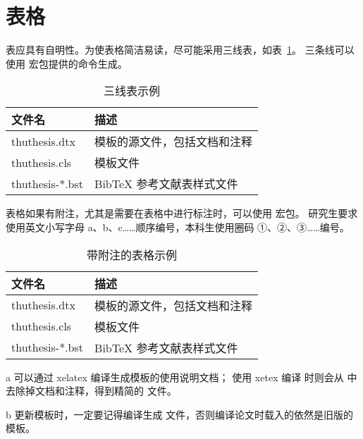 \section{表格}

表应具有自明性。为使表格简洁易读，尽可能采用三线表，如表~\ref{tab:three-line}。
三条线可以使用  宏包提供的命令生成。

\begin{table}
  \centering
  \caption{三线表示例}
  \begin{tabular}{ll}
    \toprule
    文件名          & 描述                         \\
    \midrule
    thuthesis.dtx   & 模板的源文件，包括文档和注释 \\
    thuthesis.cls   & 模板文件                     \\
    thuthesis-*.bst & BibTeX 参考文献表样式文件    \\
    \bottomrule
  \end{tabular}
  \label{tab:three-line}
\end{table}

表格如果有附注，尤其是需要在表格中进行标注时，可以使用  宏包。
研究生要求使用英文小写字母 a、b、c……顺序编号，本科生使用圈码 ①、②、③……编号。

\begin{table}
  \centering
  \begin{threeparttable}[c]
    \caption{带附注的表格示例}
    \label{tab:three-part-table}
    \begin{tabular}{ll}
      \toprule
      文件名                 & 描述                         \\
      \midrule
      thuthesis.dtx\tnote{a} & 模板的源文件，包括文档和注释 \\
      thuthesis.cls\tnote{b} & 模板文件                     \\
      thuthesis-*.bst        & BibTeX 参考文献表样式文件    \\
      \bottomrule
    \end{tabular}
    \begin{tablenotes}
      \item [a] 可以通过 xelatex 编译生成模板的使用说明文档；
        使用 xetex 编译  时则会从  中去除掉文档和注释，得到精简的  文件。
      \item [b] 更新模板时，一定要记得编译生成  文件，否则编译论文时载入的依然是旧版的模板。
    \end{tablenotes}
  \end{threeparttable}
\end{table}

